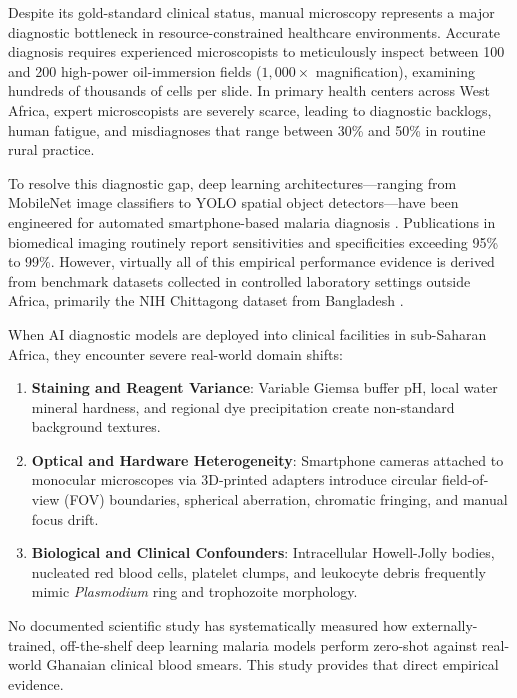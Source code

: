 \documentclass[10pt,journal,compsoc]{IEEEtran}
\begin{document}
Despite its gold-standard clinical status, manual microscopy represents a major diagnostic bottleneck in resource-constrained healthcare environments. Accurate diagnosis requires experienced microscopists to meticulously inspect between 100 and 200 high-power oil-immersion fields ($1,000\times$ magnification), examining hundreds of thousands of cells per slide. In primary health centers across West Africa, expert microscopists are severely scarce, leading to diagnostic backlogs, human fatigue, and misdiagnoses that range between 30\% and 50\% in routine rural practice.

To resolve this diagnostic gap, deep learning architectures---ranging from MobileNet image classifiers to YOLO spatial object detectors---have been engineered for automated smartphone-based malaria diagnosis \cite{rajaraman2018pretrained, yu2020malaria, yang2020deep, abdurahman2021malaria, zedda2023yolo, zedda2024deep}. Publications in biomedical imaging routinely report sensitivities and specificities exceeding 95\% to 99\%. However, virtually all of this empirical performance evidence is derived from benchmark datasets collected in controlled laboratory settings outside Africa, primarily the NIH Chittagong dataset from Bangladesh \cite{rajaraman2018pretrained, yu2020malaria}. 

When AI diagnostic models are deployed into clinical facilities in sub-Saharan Africa, they encounter severe real-world domain shifts:
\begin{enumerate}
    \item \textbf{Staining and Reagent Variance}: Variable Giemsa buffer pH, local water mineral hardness, and regional dye precipitation create non-standard background textures.
    \item \textbf{Optical and Hardware Heterogeneity}: Smartphone cameras attached to monocular microscopes via 3D-printed adapters introduce circular field-of-view (FOV) boundaries, spherical aberration, chromatic fringing, and manual focus drift.
    \item \textbf{Biological and Clinical Confounders}: Intracellular Howell-Jolly bodies, nucleated red blood cells, platelet clumps, and leukocyte debris frequently mimic \textit{Plasmodium} ring and trophozoite morphology.
\end{enumerate}

No documented scientific study has systematically measured how externally-trained, off-the-shelf deep learning malaria models perform zero-shot against real-world Ghanaian clinical blood smears. This study provides that direct empirical evidence.
\end{document}
